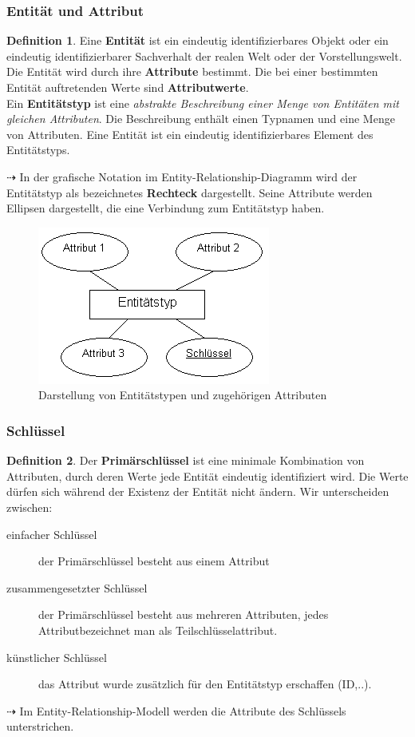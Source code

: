 \documentclass[a4paper,10pt,DIV9, BCOR12mm, oneside,openright,openbib]{scrreprt}
\theoremstyle{definition}
\newtheorem{mydef}{Definition}[section]
\theoremstyle{plain}
\begin{document}
 \subsubsection{Entität und Attribut}
 \begin{mydef}
  Eine \textbf{Entität} ist ein eindeutig identifizierbares Objekt oder ein eindeutig identifizierbarer Sachverhalt der realen Welt oder der Vorstellungswelt. Die Entität wird durch ihre \textbf{Attribute} bestimmt. Die bei einer bestimmten Entität auftretenden Werte sind \textbf{Attributwerte}. \\
  Ein \textbf{Entitätstyp} ist eine \textit{abstrakte Beschreibung einer Menge von Entitäten mit gleichen Attributen}. Die Beschreibung enthält einen Typnamen und eine Menge von Attributen. Eine Entität ist ein eindeutig identifizierbares Element des Entitätstyps.
 \end{mydef}
$\dashrightarrow$ In der grafische Notation im Entity-Relationship-Diagramm wird der Entitätstyp als bezeichnetes \textbf{Rechteck} dargestellt. Seine Attribute werden Ellipsen dargestellt, die eine Verbindung zum Entitätstyp haben.
 \begin{figure}[h]
 \centering
 \includegraphics[scale=1,keepaspectratio=true]{./Bilder/entitaet.png}
 \caption{Darstellung von Entitätstypen und zugehörigen Attributen}
 \label{fig:entitaet}
\end{figure}
 \subsubsection{Schlüssel}
  \begin{mydef}
    Der \textbf{Primärschlüssel} ist eine minimale Kombination von Attributen, durch deren Werte jede Entität eindeutig identifiziert wird. Die Werte dürfen sich während der Existenz der Entität nicht ändern. Wir unterscheiden zwischen:
    \begin{description}
      \item[einfacher Schlüssel] der Primärschlüssel besteht aus einem Attribut
      \item[zusammengesetzter Schlüssel] der Primärschlüssel besteht aus mehreren Attributen, jedes Attributbezeichnet man als Teilschlüsselattribut.
      \item[künstlicher Schlüssel] das Attribut wurde zusätzlich für den Entitätstyp erschaffen (ID,..).
    \end{description}
 \end{mydef}
$\dashrightarrow$ Im Entity-Relationship-Modell werden die Attribute des Schlüssels unterstrichen.
 
\end{document}
